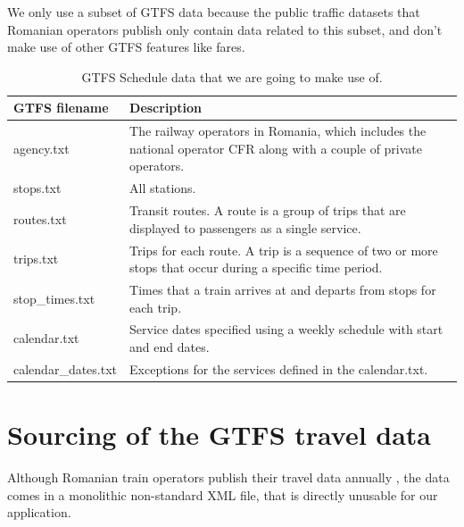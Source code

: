 We only use a subset of GTFS data because the public traffic datasets that Romanian operators publish only contain data related to this subset, and don't make use of other GTFS features like fares.

\begin{table}[htbp]
    \centering
    \begin{tabular}{|m{}|m{}|}
        \hline
        GTFS filename       & Description                                                                                                          \\
        \hline
        agency.txt          & The railway operators in Romania, which includes the national operator CFR along with a couple of private operators. \\
        \hline
        stops.txt           & All stations.                                                                                                        \\
        \hline
        routes.txt          & Transit routes. A route is a group of trips that are displayed to passengers as a single service.                    \\
        \hline
        trips.txt           & Trips for each route. A trip is a sequence of two or more stops that occur during a specific time period.            \\
        \hline
        stop\_times.txt     & Times that a train arrives at and departs from stops for each trip.                                                  \\
        \hline
        calendar.txt        & Service dates specified using a weekly schedule with start and end dates.                                            \\
        \hline
        calendar\_dates.txt & Exceptions for the services defined in the calendar.txt.                                                             \\
        \hline
    \end{tabular}
    \caption{GTFS Schedule data that we are going to make use of.}
    \label{TableGTFS}
\end{table}

\section{Sourcing of the GTFS travel data}

Although Romanian train operators publish their travel data annually \cite{DataGovRoDespre} \cite{DataGovRoLicense}, the data comes in a monolithic non-standard XML file, that is directly unusable for our application.

